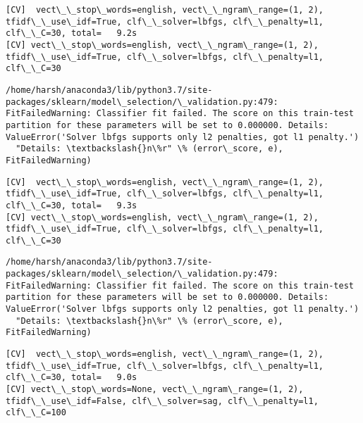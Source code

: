 \documentclass[11pt]{article}
\begin{document}
    \begin{Verbatim}[commandchars=\\\{\}]
[CV]  vect\_\_stop\_words=english, vect\_\_ngram\_range=(1, 2), tfidf\_\_use\_idf=True, clf\_\_solver=lbfgs, clf\_\_penalty=l1, clf\_\_C=30, total=   9.2s
[CV] vect\_\_stop\_words=english, vect\_\_ngram\_range=(1, 2), tfidf\_\_use\_idf=True, clf\_\_solver=lbfgs, clf\_\_penalty=l1, clf\_\_C=30 

    \end{Verbatim}

    \begin{Verbatim}[commandchars=\\\{\}]
/home/harsh/anaconda3/lib/python3.7/site-packages/sklearn/model\_selection/\_validation.py:479: FitFailedWarning: Classifier fit failed. The score on this train-test partition for these parameters will be set to 0.000000. Details: 
ValueError('Solver lbfgs supports only l2 penalties, got l1 penalty.')
  "Details: \textbackslash{}n\%r" \% (error\_score, e), FitFailedWarning)

    \end{Verbatim}

    \begin{Verbatim}[commandchars=\\\{\}]
[CV]  vect\_\_stop\_words=english, vect\_\_ngram\_range=(1, 2), tfidf\_\_use\_idf=True, clf\_\_solver=lbfgs, clf\_\_penalty=l1, clf\_\_C=30, total=   9.3s
[CV] vect\_\_stop\_words=english, vect\_\_ngram\_range=(1, 2), tfidf\_\_use\_idf=True, clf\_\_solver=lbfgs, clf\_\_penalty=l1, clf\_\_C=30 

    \end{Verbatim}

    \begin{Verbatim}[commandchars=\\\{\}]
/home/harsh/anaconda3/lib/python3.7/site-packages/sklearn/model\_selection/\_validation.py:479: FitFailedWarning: Classifier fit failed. The score on this train-test partition for these parameters will be set to 0.000000. Details: 
ValueError('Solver lbfgs supports only l2 penalties, got l1 penalty.')
  "Details: \textbackslash{}n\%r" \% (error\_score, e), FitFailedWarning)

    \end{Verbatim}

    \begin{Verbatim}[commandchars=\\\{\}]
[CV]  vect\_\_stop\_words=english, vect\_\_ngram\_range=(1, 2), tfidf\_\_use\_idf=True, clf\_\_solver=lbfgs, clf\_\_penalty=l1, clf\_\_C=30, total=   9.0s
[CV] vect\_\_stop\_words=None, vect\_\_ngram\_range=(1, 2), tfidf\_\_use\_idf=False, clf\_\_solver=sag, clf\_\_penalty=l1, clf\_\_C=100 

    \end{Verbatim}
\end{document}
